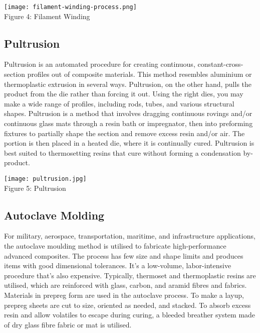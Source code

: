 \documentclass{article}
\begin{document}
\begin{multicols}{2}
\begin{center}
\texttt{[image: filament-winding-process.png]}\\

{\small Figure 4: Filament Winding}
\end{center}

\subsection{Pultrusion}

Pultrusion is an automated procedure for creating continuous, constant-cross-section profiles out of composite materials. This method resembles aluminium or thermoplastic extrusion in several ways. Pultrusion, on the other hand, pulls the product from the die rather than forcing it out. Using the right dies, you may make a wide range of profiles, including rods, tubes, and various structural shapes. Pultrusion is a method that involves dragging continuous rovings and/or continuous glass mats through a resin bath or impregnator, then into preforming fixtures to partially shape the section and remove excess resin and/or air. The portion is then placed in a heated die, where it is continually cured. Pultrusion is best suited to thermosetting resins that cure without forming a condensation by-product.

\begin{center}
\texttt{[image: pultrusion.jpg]}\\

{\small Figure 5: Pultrusion}
\end{center}

\subsection{Autoclave Molding}

For military, aerospace, transportation, maritime, and infrastructure applications, the autoclave moulding method is utilised to fabricate high-performance advanced composites. The process has few size and shape limits and produces items with good dimensional tolerances. It's a low-volume, labor-intensive procedure that's also expensive. Typically, thermoset and thermoplastic resins are utilised, which are reinforced with glass, carbon, and aramid fibres and fabrics. Materials in prepreg form are used in the autoclave process. To make a layup, prepreg sheets are cut to size, oriented as needed, and stacked. To absorb excess resin and allow volatiles to escape during curing, a bleeded breather system made of dry glass fibre fabric or mat is utilised.


\end{multicols}
\end{document}
